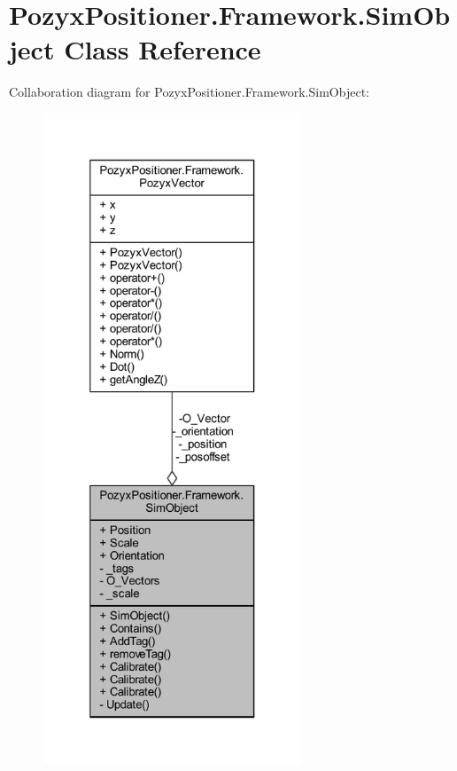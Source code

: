 \hypertarget{class_pozyx_positioner_1_1_framework_1_1_sim_object}{}\section{Pozyx\+Positioner.\+Framework.\+Sim\+Object Class Reference}
\label{class_pozyx_positioner_1_1_framework_1_1_sim_object}


Collaboration diagram for Pozyx\+Positioner.\+Framework.\+Sim\+Object\+:
\nopagebreak
\begin{figure}[H]
\begin{center}
\leavevmode
\includegraphics[height=550pt]{class_pozyx_positioner_1_1_framework_1_1_sim_object__coll__graph}
\end{center}
\end{figure}
